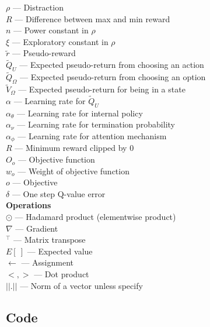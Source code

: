 \documentclass{article}
\begin{document}
	$\rho$ --- Distraction\\
	$R$ --- Difference between max and min reward\\
	$n$ --- Power constant in $\rho$\\
	$\xi$ --- Exploratory constant in $\rho$\\
	$\widetilde{r}$ --- Pseudo-reward\\
	$\widetilde{Q}_U$ --- Expected pseudo-return from choosing an action\\
	$\widetilde{Q}_\Omega$ --- Expected pseudo-return from choosing an option\\
	$\widetilde{V}_\Omega$ --- Expected pseudo-return for being in a state\\
	$\alpha$ --- Learning rate for $\widetilde{Q}_U$\\
	$\alpha_\theta$ --- Learning rate for internal policy\\
	$\alpha_\nu$ --- Learning rate for termination probability\\
	$\alpha_\phi$ --- Learning rate for attention mechanism\\
	$R$ --- Minimum reward clipped by 0\\
	$O_o$ --- Objective function\\
	$w_o$ --- Weight of objective function\\
	$o$ --- Objective\\
	$\delta$ --- One step Q-value error\\
	{\bfseries Operations}\\
	$\odot$ --- Hadamard product (elementwise product)\\
	$\nabla$ --- Gradient\\
	$^\intercal$ --- Matrix transpose\\
	$E[\ ]$ --- Expected value\\
	$\leftarrow$ --- Assignment\\
	$<,>$ --- Dot product\\
	$||.||$ --- Norm of a vector unless specify\\
	
	\subsection*{Code}
\end{document}

